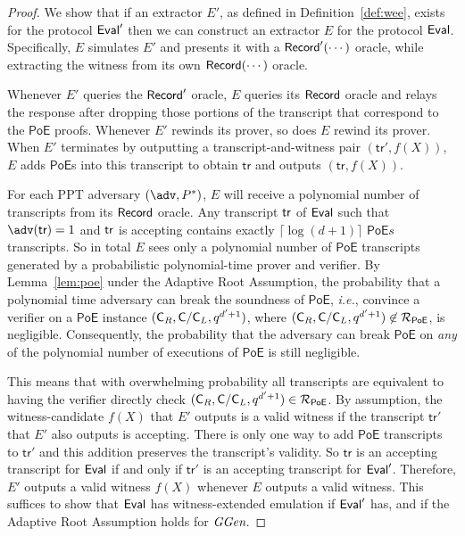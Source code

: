 \documentclass{article}
\theoremstyle{definition}
\begin{document}
\begin{proof}
We show that if an extractor $E'$, as defined in Definition~\ref{def:wee}, exists for the protocol $\textsf{{Eval}}'$ then we can construct an extractor $E$ for the protocol $\textsf{{Eval}}$. Specifically, $E$ simulates $E'$ and presents it with a $\textsf{{Record}}'(\cdots)$ oracle, while extracting the witness from its own $\textsf{{Record}}(\cdots)$ oracle.

Whenever $E'$ queries the $\textsf{{Record}}'$ oracle, $E$ queries its $\textsf{{Record}}$ oracle and relays the response after dropping those portions of the transcript that correspond to the $\mathsf{PoE}$ proofs. Whenever $E'$ rewinds its prover, so does $E$ rewind its prover. When $E'$ terminates by outputting a transcript-and-witness pair $(\mathsf{tr}', f(X))$, $E$ adds $\mathsf{PoE}$s into this transcript to obtain $\mathsf{tr}$ and outputs $(\mathsf{tr}, f(X))$.

For each PPT adversary $(\adv,P^*)$, $E$ will receive a polynomial number of transcripts from its $\textsf{{Record}}$ oracle. Any transcript $\textsf{{tr}}$ of $\textsf{{Eval}}$ such that $\adv(\tr)=1$ and $\textsf{{tr}}$ is accepting contains exactly $\lceil \log(d+1)\rceil$ $\textsf{PoE}s$ transcripts. 
So in total $E$ sees only a polynomial number of $\textsf{PoE}$ transcripts generated by a probabilistic polynomial-time prover and verifier. By Lemma~\ref{lem:poe} under the Adaptive Root Assumption, the probability that a polynomial time adversary can break the soundness of $\textsf{PoE}$, \emph{i.e.}, convince a verifier on a $\textsf{PoE}$ instance $(\mathsf{C}_R,\mathsf{C}/\mathsf{C}_{L},q^{d'+1})$, where $(\mathsf{C}_R,\mathsf{C}/\mathsf{C}_{L},q^{d'+1})\not\in\mathcal{R}_{\textsf{PoE}}$, is negligible. 
Consequently, the probability that the adversary can break $\textsf{PoE}$ on \emph{any} of the polynomial number of executions of $\mathsf{PoE}$ is still negligible.

This means that with overwhelming probability all transcripts are equivalent to having the verifier directly check $(\mathsf{C}_R,\mathsf{C}/\mathsf{C}_{L},q^{d'+1})\in\mathcal{R}_{\textsf{PoE}}$. By assumption, the witness-candidate $f(X)$ that $E'$ outputs is a valid witness if the transcript $\mathsf{tr}'$ that $E'$ also outputs is accepting. There is only one way to add $\mathsf{PoE}$ transcripts to $\mathsf{tr}'$ and this addition preserves the transcript's validity. So $\mathsf{tr}$ is an accepting transcript for $\textsf{{Eval}}$ if and only if $\mathsf{tr}'$ is an accepting transcript for $\textsf{{Eval}}'$. Therefore, $E'$ outputs a valid witness $f(X)$ whenever $E$ outputs a valid witness. This suffices to show that $\textsf{{Eval}}$ has witness-extended emulation if $\textsf{{Eval}}'$ has, and if the Adaptive Root Assumption holds for $\textit{GGen}$.
\end{proof}
\end{document}
